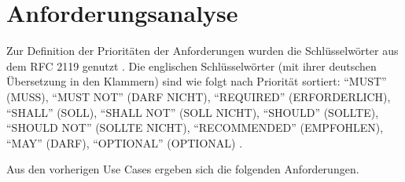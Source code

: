 \section{Anforderungsanalyse}\label{sec:Anforderungen}
    Zur Definition der Prioritäten der Anforderungen wurden die Schlüsselwörter aus dem \gls{RFC} 2119 genutzt \parencite{Keywords.Bradner.1997}.
    Die englischen Schlüsselwörter (mit ihrer deutschen Übersetzung in den Klammern) sind wie folgt nach Priorität sortiert:
    \enquote{MUST} (MUSS), \enquote{MUST NOT} (DARF NICHT), \enquote{REQUIRED} (ERFORDERLICH), \enquote{SHALL} (SOLL), \enquote{SHALL NOT} (SOLL NICHT), \enquote{SHOULD} (SOLLTE), \enquote{SHOULD NOT} (SOLLTE NICHT), \enquote{RECOMMENDED} (EMPFOHLEN), \enquote{MAY} (DARF), \enquote{OPTIONAL} (OPTIONAL) \parencite{Keywords.Bradner.1997}.

    Aus den vorherigen Use Cases ergeben sich die folgenden Anforderungen.
    
    




\begin{comment}
    So kann man auf Anforderungen refernzieren
    \RequirementInRef{FJ-F-1}{Zuverlässige Zustellung der Nachrichten}
    \RequirementInRef{FJ-F-2}{Erkennung eines Knotenausfalls}
    \RequirementInRef{FJ-F-3}{Geordnete Zustellung der Ereignisse}
    \RequirementInRef{FJ-F-4}{Unterschiedliche Ereignistypen}
    \RequirementInRef{FJ-F-5}{Schnittstelle zum SEM Cache}
    \RequirementInRef{FJ-F-6}{Erkennung des Ereignisses durch M2000}
    \RequirementInRef{FJ-F-7}{Hochfahren einer Unit}

    \RequirementInRef{FJ-NF-1}{Ausfallsicherheit}
    \RequirementInRef{FJ-NF-2}{Anpassbarkeit und Wartbarkeit}
    \RequirementInRef{FJ-NF-3}{Support}
    \RequirementInRef{FJ-NF-4}{Lizenzen}
    \RequirementInRef{FJ-NF-5}{Implementierungsaufwand}
    \RequirementInRef{FJ-NF-6}{Koexistenz beider Implementierungen}
    \RequirementInRef{FJ-NF-7}{Betrieb im Mischcluster}
    \RequirementInRef{FJ-NF-8}{Datensicherheit}
    \RequirementInRef{FJ-NF-9}{Datenintegrität}
    \RequirementInRef{FJ-NF-10}{Universelle Schnittstellen für Producer}
    \RequirementInRef{FJ-NF-11}{Skalierbarkeit}
    \RequirementInRef{FJ-NF-12}{Updatemanager}
\end{comment}